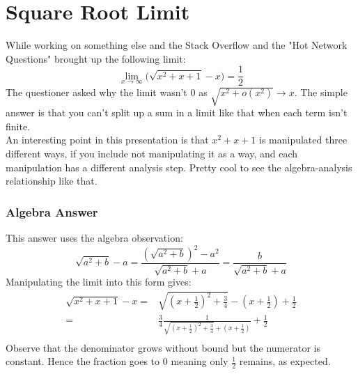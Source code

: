 
\section{Square Root Limit}
While working on something else and the Stack Overflow and the "Hot Network Questions" brought up the following limit:
\[\lim_{x\rightarrow \infty} \bigg(\sqrt{x^2+x+1} - x\bigg) = \frac{1}{2}\]
The questioner asked why the limit wasn't $0$ as $\sqrt{x^2+o(x^2)}\rightarrow x$.
The simple answer is that you can't split up a sum in a limit like that when each term isn't finite.
\\
An interesting point in this presentation is that $x^2+x+1$ is manipulated three different ways, 
if you include not manipulating it as a way,
and each manipulation has a different analysis step.
Pretty cool to see the algebra-analysis relationship like that.

\subsubsection{Algebra Answer}
This answer uses the algebra observation:
\[\sqrt{a^2+b}-a =\frac{(\sqrt{a^2+b})^2-a^2}{\sqrt{a^2+b}+a}=\frac{b}{\sqrt{a^2+b}+a}\]
Manipulating the limit into this form gives:
\begin{equation*}
\begin{aligned}
\sqrt{x^2+x+1} - x=& \sqrt{\left(x+\frac{1}{2}\right)^2+\frac{3}{4}}-\left(x+\frac{1}{2}\right)+\frac{1}{2}\\
=&\frac{3}{4}\frac{1}{\sqrt{\left(x+\frac{1}{2}\right)^2+\frac{3}{4}}+\left(x+\frac{1}{2}\right)}+\frac{1}{2}\\
\end{aligned}
\end{equation*}
Observe that the denominator grows without bound but the numerator is constant.
Hence the fraction goes to $0$ meaning only $\frac{1}{2}$ remains, 
as expected.

